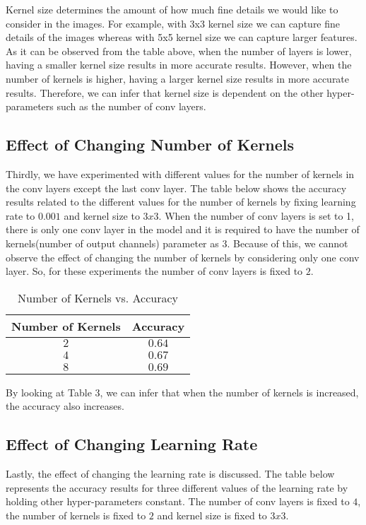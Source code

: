 \documentclass[12pt]{article}
\begin{document}
Kernel size determines the amount of how much fine details we would like to consider in the images. For example, with 3x3 kernel size we can capture fine details of the images whereas with 5x5 kernel size we can capture larger features. As it can be observed from the table above, when the number of layers is lower, having a smaller kernel size results in more accurate results. However, when the number of kernels is higher, having a larger kernel size results in more accurate results. Therefore, we can infer that kernel size is dependent on the other hyper-parameters such as the number of conv layers.

\subsection{Effect of Changing Number of Kernels}
Thirdly, we have experimented with different values for the number of kernels in the conv layers except the last conv layer. The table below shows the accuracy results related to the different values for the number of kernels by fixing learning rate to $0.001$ and kernel size to $3x3$. When the number of conv layers is set to 1, there is only one conv layer in the model and it is required to have the number of kernels(number of output channels) parameter as 3. Because of this, we cannot observe the effect of changing the number of kernels by considering only one conv layer. So, for these experiments the number of conv layers is fixed to $2$.

\begin{table}[H]
\begin{center}
\caption{Number of Kernels vs. Accuracy}
\begin{tabular}{|c|c|}
\hline
 Number of Kernels & Accuracy \\
\hline
$2$ & $0.64$ \\
\hline
$4$ & $0.67$ \\
\hline
$8$ & $0.69$ \\
\hline
\end{tabular}
\end{center}
\end{table}

By looking at Table 3, we can infer that when the number of kernels is increased, the accuracy also increases.

\subsection{Effect of Changing Learning Rate}
Lastly, the effect of changing the learning rate is discussed. The table below represents the accuracy results for three different values of the learning rate by holding other hyper-parameters constant. The number of conv layers is fixed to $4$, the number of kernels is fixed to $2$ and kernel size is fixed to $3x3$.
\end{document}
